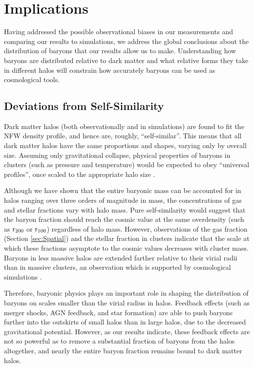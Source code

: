 \section{Implications}
\label{sec:Implications}

Having addressed the possible observational biases in our measurements
and comparing our results to simulations, we address the global
conclusions about the distribution of baryons that our results allow
us to make. Understanding how baryons are distributed relative to dark
matter and what relative forms they take in different halos will
constrain how accurately baryons can be used as cosmological tools.

\subsection{Deviations from Self-Similarity}
\label{sec:Implications.Invariance}

Dark matter halos (both observationally and in simulations) are found
to fit the NFW density profile, and hence are, roughly,
``self-similar''. This means that all dark matter halos have the same
proportions and shapes, varying only by overall size. Assuming only
gravitational collapse, physical properties of baryons in clusters
(such as pressure and temperature) would be expected to obey
``universal profiles'', once scaled to the appropriate halo size
.

Although we have shown that the entire baryonic mass can be accounted
for in halos ranging over three orders of magnitude in mass, the
concentrations of gas and stellar fractions vary with halo mass. Pure
self-similarity would suggest that the baryon fraction should reach
the cosmic value at the same overdensity (such as $\textrm{r\ensuremath{_{200}}}$ or
$\textrm{r}{}_{100}$) regardless of halo mass. However, observations of
the gas fraction (Section \ref{sec:Spatial}) and the stellar fraction
\citep{Bahcall2014} in clusters indicate that the scale at which these
fractions asymptote to the cosmic values decreases with cluster
mass. Baryons in less massive halos are extended farther relative to
their virial radii than in massive clusters, an observation which is
supported by cosmological simulations \citep{Battaglia2013}.

Therefore, baryonic physics plays an important role in shaping the
distribution of baryons on scales smaller than the virial radius in
halos. Feedback effects (such as merger shocks, AGN feedback, and star
formation) are able to push baryons further into the outskirts of
small halos than in large halos, due to the decreased gravitational
potential. However, as our results indicate, these feedback effects
are not so powerful as to remove a substantial fraction of baryons
from the halos altogether, and nearly the entire baryon fraction
remains bound to dark matter halos.

